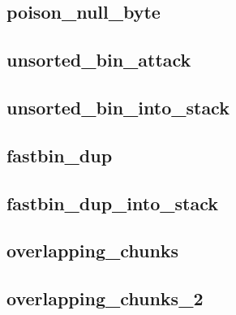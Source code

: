 \subsection{poison\_null\_byte}

\subsection{unsorted\_bin\_attack}

\subsection{unsorted\_bin\_into\_stack}

\subsection{fastbin\_dup}

\subsection{fastbin\_dup\_into\_stack}

\subsection{overlapping\_chunks}

\subsection{overlapping\_chunks\_2}

\newpage